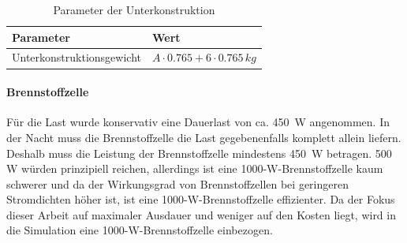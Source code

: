 \begin{table}[h]
\centering
\begin{tabular}{|l|l|}
\hline
\textbf{Parameter} & \textbf{Wert} \\ \hline
Unterkonstruktionsgewicht & $A \cdot 0.765 + 6 \cdot 0.765\, kg $ \\ \hline
\end{tabular}
\caption{Parameter der Unterkonstruktion \cite{Unterkonstruktion}}
\end{table}

\paragraph{Brennstoffzelle}
Für die Last wurde konservativ eine Dauerlast von ca. 450~W angenommen. In der Nacht muss die Brennstoffzelle die Last gegebenenfalls komplett allein liefern. Deshalb muss die Leistung der Brennstoffzelle mindestens 450~W betragen. 500 W würden prinzipiell reichen, allerdings ist eine 1000-W-Brennstoffzelle kaum schwerer und da der Wirkungsgrad von Brennstoffzellen bei geringeren Stromdichten höher ist, ist eine 1000-W-Brennstoffzelle effizienter. Da der Fokus dieser Arbeit auf maximaler Ausdauer und weniger auf den Kosten liegt, wird in die Simulation eine 1000-W-Brennstoffzelle einbezogen. \\

